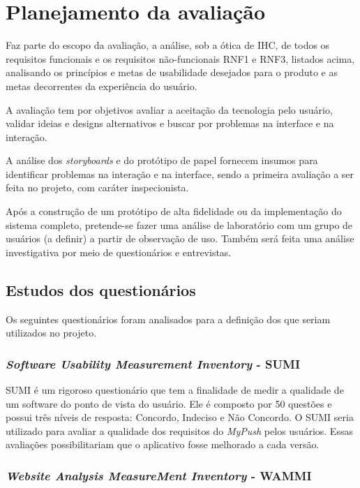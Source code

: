 \chapter{Planejamento da avaliação}

  Faz parte do escopo da avaliação, a análise, sob a ótica de IHC, de todos os requisitos funcionais e os requisitos não-funcionais
  RNF1 e RNF3, listados acima, analisando os princípios e metas de usabilidade desejados para o produto e as metas decorrentes
  da experiência do usuário.
  
  A avaliação tem por objetivos avaliar a aceitação da tecnologia pelo usuário, validar ideias e designs alternativos e buscar
  por problemas na interface e na interação.
  
  A análise dos \textit{storyboards} e do protótipo de papel fornecem insumos para identificar problemas na interação e na interface,
  sendo a primeira avaliação a ser feita no projeto, com caráter inspecionista.
  
  Após a construção de um protótipo de alta fidelidade ou da implementação do sistema completo, pretende-se fazer uma análise
  de laboratório com um grupo de usuários (a definir) a partir de observação de uso. Também será feita uma análise investigativa
  por meio de questionários e entrevistas.

  \section{Estudos dos questionários}
    
    Os seguintes questionários foram analisados para a definição dos que seriam utilizados no projeto.
    
    \subsection{\textit{Software Usability Measurement Inventory} - SUMI}
      
      \nocite{summi}
      SUMI é um rigoroso questionário que tem a finalidade de medir a qualidade de um software do ponto de vista do usuário.
      Ele é composto por 50 questões e possui três níveis de resposta: Concordo, Indeciso e Não Concordo. O SUMI seria utilizado
      para avaliar a qualidade dos requisitos do \textit{MyPush} pelos usuários. Essas avaliações possibilitariam que o aplicativo fosse
      melhorado a cada versão.
      
    \subsection{\textit{Website Analysis MeasureMent Inventory} - WAMMI}
      
